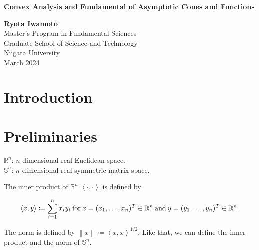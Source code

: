 \documentclass[a4paper,11pt, oneside]{book}
\theoremstyle{definition}
\newcommand{\NDemenstionalRealEuclideanSpace}{\mathbb{R}^n}
\newcommand{\NDemenstionalRealSymmetricMatrixSpace}{\mathbb{S}^n}
\newcommand{\InnerProduct}[2]{\left\langle {#1},{#2}\right\rangle} %
\begin{document}
\begin{titlepage}
\begin{center}
\vspace*{10mm}
{\bf \Huge Convex Analysis and Fundamental of Asymptotic Cones and Functions}
\vspace{80mm}

{\bf \Huge Ryota Iwamoto}\\
\vspace{15mm}
{\huge Master's Program in Fundamental Sciences}\\
\vspace{5mm}
{\huge Graduate School of Science and Technology}\\
\vspace{5mm}
{\huge Niigata University}\\
\vspace{15mm}
{\huge March 2024}
\end{center}
\end{titlepage}

\tableofcontents

\chapter{Introduction}


\chapter{Preliminaries}

$\NDemenstionalRealEuclideanSpace$: $n$-dimensional real Euclidean space. \\
$\NDemenstionalRealSymmetricMatrixSpace$: $n$-dimensional real symmetric matrix space.

The inner product of $\NDemenstionalRealEuclideanSpace$ $\left\langle \cdot ,\cdot \right\rangle$  is defined by

  \begin{equation}
    \InnerProduct{x}{y} \coloneqq \sum_{i = 1}^{n} x_i y_i \:\text{for}\: x=(x_1,\dots,x_n)^T \in \mathbb{R}^n \:\text{and}\: y=(y_1,\dots,y_n)^T \in \mathbb{R}^n. \notag
  \end{equation}

The norm is defined by $\left\lVert x \right\rVert \coloneqq \InnerProduct{x}{x} ^{1/2} $. Like that, we can define the inner product and the norm of $\NDemenstionalRealSymmetricMatrixSpace$.
\end{document}
